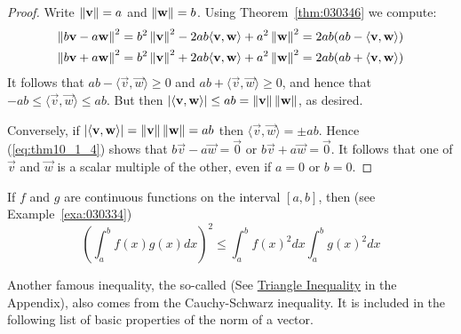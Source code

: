 \documentclass{ximera}
\begin{document}
\begin{proof}
Write $\left\lVert\mathbf{v}\right\rVert = a$ and $\left\lVert\mathbf{w}\right\rVert = b$. Using Theorem~\ref{thm:030346} we compute:
\begin{equation}
\label{eq:thm10_1_4}
\begin{split}
	\left\lVert b\mathbf{v} - a \mathbf{w} \right\rVert^2 &= b^2 \left\lVert \mathbf{v} \right\rVert^2 - 2ab \langle \mathbf{v}, \mathbf{w} \rangle + a^2\left\lVert \mathbf{w} \right\rVert^2 = 2ab(ab - \langle \mathbf{v}, \mathbf{w} \rangle) \\
	\left\lVert b\mathbf{v} + a \mathbf{w} \right\rVert^2 &= b^2 \left\lVert \mathbf{v} \right\rVert^2 + 2ab \langle \mathbf{v}, \mathbf{w} \rangle + a^2\left\lVert \mathbf{w} \right\rVert^2 = 2ab(ab + \langle \mathbf{v}, \mathbf{w} \rangle) \\
\end{split}
\end{equation}
It follows that $ab - \langle\vec{v}, \vec{w}\rangle \geq 0$ and
$ab + \langle\vec{v}, \vec{w}\rangle \geq 0$, and hence that $-ab \leq \langle\vec{v}, \vec{w}\rangle \leq ab$. But then $| \langle\mathbf{v}, \mathbf{w}\rangle | \leq ab = \left\lVert\mathbf{v}\right\rVert \left\lVert \mathbf{w}\right\rVert$, as desired.

Conversely, if $|\langle \mathbf{v},  \mathbf{w}\rangle | =
\left\lVert\mathbf{v}\right\rVert \left\lVert \mathbf{w} \right\rVert = ab$
then $\langle\vec{v}, \vec{w}\rangle = \pm ab$. Hence (\ref{eq:thm10_1_4}) shows that $b\vec{v} - a\vec{w} = \vec{0}$ or $b\vec{v} + a\vec{w} = \vec{0}$. It follows that one of $\vec{v}$ and $\vec{w}$ is a scalar multiple of the other, even if $a = 0$ or $b = 0$.
\end{proof}

\begin{example}\label{exa:030499}
If $f$ and $g$ are continuous functions on the interval $[a, b]$, then (see Example~\ref{exa:030334})
\begin{equation*}
\left(\int_{a}^{b} f(x)g(x)dx \right) ^2 \leq \int_{a}^{b} f(x)^2 dx \int_{a}^{b} g(x)^2 dx
\end{equation*}
\end{example}

Another famous inequality, the so-called  (See \href{https://ximera.osu.edu/oerlinalg/LinearAlgebra/APX-0010/main}{Triangle Inequality} in the Appendix), also comes from the Cauchy-Schwarz inequality. It is included in the following list of basic properties of the norm of a vector.
\end{document}
